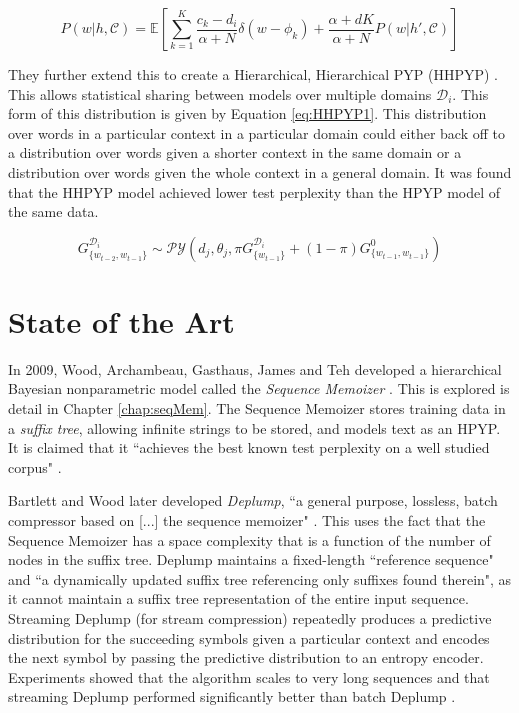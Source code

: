\begin{equation}
P(w|h,\mathcal{C})=\mathbb{E}\left[\sum_{k=1}^{K}\frac{c_{k}-d_{i}}{\alpha+N}\delta(w-\phi_{k})+\frac{\alpha+dK}{\alpha+N}P(w|h',\mathcal{C})\right]
\label{eq:HBNASLMDA2.1posterior}
\end{equation}

They further extend this to create a Hierarchical, Hierarchical PYP (HHPYP) \cite{wood2008hierarchical} . This allows statistical sharing between models over multiple domains $\mathcal{D}_{i}$. This form of this distribution is given by Equation \ref{eq:HHPYP1}. This distribution over words in a particular context in a particular domain could either back off to a distribution over words given a shorter context in the same domain or a distribution over words given the whole context in a general domain. It was found that the HHPYP model achieved lower test perplexity than the HPYP model of the same data. 



\begin{equation}
G_{\{w_{t-2},w_{t-1}\}}^{\mathcal{D}_{i}}\sim\mathcal{PY}(d_{j},\theta_{j},\pi G_{\{w_{t-1}\}}^{\mathcal{D}_{i}}+(1-\pi)G_{\{w_{t-1},w_{t-1}\}}^{0})
\label{eq:HHPYP1}
\end{equation}


\section{State of the Art}

In 2009, Wood, Archambeau, Gasthaus, James and Teh developed a hierarchical Bayesian nonparametric model called the \textit{Sequence Memoizer} \cite{wood2009stochastic} \cite{wood2011sequence}. This is explored is detail in Chapter \ref{chap:seqMem}. The Sequence Memoizer stores training data in a \textit{suffix tree}, allowing infinite strings to be stored, and models text as an HPYP. It is claimed that it ``achieves the best known test perplexity on a well studied corpus" \cite{wood2009stochastic}.

Bartlett and Wood later developed \textit{Deplump}, ``a general purpose, lossless, batch compressor based on [...] the sequence memoizer" \cite{bartlett2011deplump}. This uses the fact that the Sequence Memoizer has a space complexity that is a function of the number of nodes in the suffix tree. Deplump maintains a fixed-length ``reference sequence" and ``a dynamically updated suffix tree referencing only suffixes found therein", as it cannot maintain a suffix tree representation of the entire input sequence. Streaming Deplump (for stream compression) repeatedly produces a predictive distribution for the succeeding symbols given a particular context and encodes the next symbol by passing the predictive distribution to an entropy encoder. Experiments showed that the algorithm scales to very long sequences and that streaming Deplump performed significantly better than batch Deplump .

